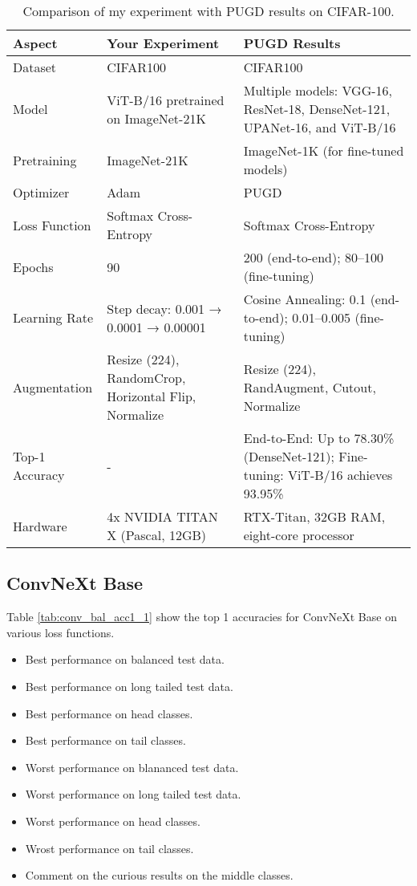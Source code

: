 \begin{table}[H]
    \centering
    \renewcommand{\arraystretch}{1.2} %
    \setlength{\tabcolsep}{4pt} %
    \begin{tabular}{lp{6cm}p{6cm}}
        \toprule
        \textbf{Aspect} & \textbf{Your Experiment} & \textbf{PUGD Results} \\ 
        \midrule
        Dataset           & CIFAR100 & CIFAR100 \\
        Model             & ViT-B/16 pretrained on ImageNet-21K & Multiple models: VGG-16, ResNet-18, DenseNet-121, UPANet-16, and ViT-B/16 \\
        Pretraining       & ImageNet-21K & ImageNet-1K (for fine-tuned models) \\
        Optimizer         & Adam & PUGD \\
        Loss Function     & Softmax Cross-Entropy & Softmax Cross-Entropy \\
        Epochs            & 90 & 200 (end-to-end); 80–100 (fine-tuning) \\
        Learning Rate     & Step decay: 0.001 → 0.0001 → 0.00001 & Cosine Annealing: 0.1 (end-to-end); 0.01–0.005 (fine-tuning) \\
        Augmentation      & Resize (224), RandomCrop, Horizontal Flip, Normalize & Resize (224), RandAugment, Cutout, Normalize \\
        Top-1 Accuracy    & - & End-to-End: Up to 78.30\% (DenseNet-121); Fine-tuning: ViT-B/16 achieves 93.95\% \\
        Hardware          & 4x NVIDIA TITAN X (Pascal, 12GB) & RTX-Titan, 32GB RAM, eight-core processor \\
        \bottomrule
    \end{tabular}
    \caption{Comparison of my experiment with PUGD results on CIFAR-100.}
    \label{tab:comparison3}
\end{table}


\subsection{ConvNeXt Base}

Table \ref{tab:conv_bal_acc1_1} show the top 1 accuracies for ConvNeXt Base on various loss functions.

\begin{itemize}
    \item Best performance on balanced test data.
    \item Best performance on long tailed test data.
    \item Best performance on head classes.
    \item Best performance on tail classes.
    \item Worst performance on blananced test data.
    \item Worst performance on long tailed test data.
    \item Worst performance on head classes.
    \item Wrost performance on tail classes.
    \item Comment on the curious results on the middle classes.
\end{itemize}

